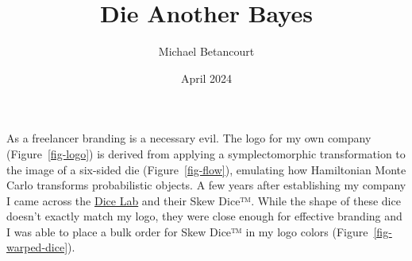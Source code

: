 \documentclass[
  letterpaper,
  DIV=11,
  numbers=noendperiod]{scrartcl}
\title{Die Another Bayes}
\author{Michael Betancourt}
\date{April 2024}
\renewcommand*\contentsname{Table of contents}
\newcommand\contentsname{Table of contents}
\begin{document}
\maketitle

\renewcommand*\contentsname{Table of contents}
{
\hypersetup{linkcolor=}
\setcounter{tocdepth}{3}
\tableofcontents
}
As a freelancer branding is a necessary evil. The logo for my own
company (Figure~\ref{fig-logo}) is derived from applying a
symplectomorphic transformation to the image of a six-sided die
(Figure~\ref{fig-flow}), emulating how Hamiltonian Monte Carlo
transforms probabilistic objects. A few years after establishing my
company I came across the
\href{https://www.mathartfun.com/thedicelab.com/}{Dice Lab} and their
Skew Dice™. While the shape of these dice doesn't exactly match my logo,
they were close enough for effective branding and I was able to place a
bulk order for Skew Dice™ in my logo colors
(Figure~\ref{fig-warped-dice}).
\end{document}
